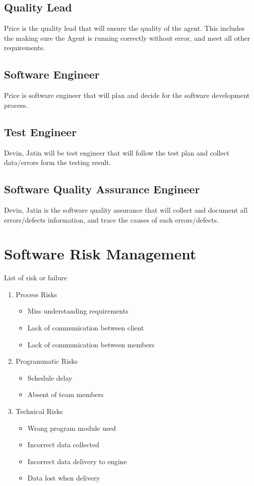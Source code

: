\documentclass[letterpaper,12pt,oneside,listof=totoc]{scrreprt}
\begin{document}
\subsection{Quality Lead}
Price is the quality lead that will ensure the quality of the agent. This includes the making sure the Agent is running correctly without error, and meet all other requirements. 
\subsection{Software Engineer} 
Price is software engineer that will plan and decide for the software development process.
\subsection{Test Engineer}
Devin, Jatin will be test engineer that will follow the test plan and collect data/errors form the testing result. 
\subsection{Software Quality Assurance Engineer}
Devin, Jatin is the software quality assurance that will collect and document all errors/defects information, and trace the causes of each errors/defects. 
\section{Software Risk Management}
List of risk or failure
\begin{enumerate}
\item Process Risks 
    \begin{itemize}
        \item Miss understanding requirements
        \item Lack of communication between client
        \item Lack of communication between members
    \end{itemize}

\item Programmatic Risks
    \begin{itemize}
        \item Schedule delay
        \item Absent of team members
    \end{itemize}
    
\item Technical Risks
    \begin{itemize}
        \item Wrong program module used
        \item Incorrect data collected
        \item Incorrect data delivery to engine
        \item Data lost when delivery
    \end{itemize}

\end{enumerate}
\end{document}
